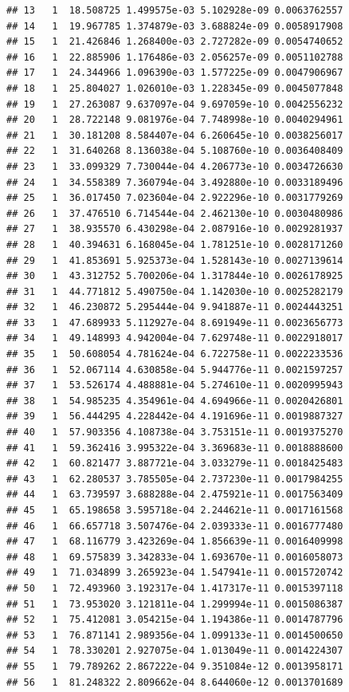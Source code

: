 \documentclass[article]{jss}\usepackage[]{graphicx}\usepackage[]{xcolor}
\makeatletter
\newenvironment{kframe}{%
 \def\at@end@of@kframe{}%
 \ifinner\ifhmode%
  \def\at@end@of@kframe{\end{minipage}}%
  \begin{minipage}{\columnwidth}%
 \fi\fi%
 \def\FrameCommand##1{\hskip\@totalleftmargin \hskip-\fboxsep
 \colorbox{shadecolor}{##1}\hskip-\fboxsep
     \hskip-\linewidth \hskip-\@totalleftmargin \hskip\columnwidth}%
 \MakeFramed {\advance\hsize-\width
   \@totalleftmargin\z@ \linewidth\hsize
   \@setminipage}}%
 {\par\unskip\endMakeFramed%
 \at@end@of@kframe}
\newenvironment{knitrout}{}{} %
\makeatother
\begin{document}
\begin{knitrout}
\begin{kframe}
\begin{verbatim}
## 13   1  18.508725 1.499575e-03 5.102928e-09 0.0063762557
## 14   1  19.967785 1.374879e-03 3.688824e-09 0.0058917908
## 15   1  21.426846 1.268400e-03 2.727282e-09 0.0054740652
## 16   1  22.885906 1.176486e-03 2.056257e-09 0.0051102788
## 17   1  24.344966 1.096390e-03 1.577225e-09 0.0047906967
## 18   1  25.804027 1.026010e-03 1.228345e-09 0.0045077848
## 19   1  27.263087 9.637097e-04 9.697059e-10 0.0042556232
## 20   1  28.722148 9.081976e-04 7.748998e-10 0.0040294961
## 21   1  30.181208 8.584407e-04 6.260645e-10 0.0038256017
## 22   1  31.640268 8.136038e-04 5.108760e-10 0.0036408409
## 23   1  33.099329 7.730044e-04 4.206773e-10 0.0034726630
## 24   1  34.558389 7.360794e-04 3.492880e-10 0.0033189496
## 25   1  36.017450 7.023604e-04 2.922296e-10 0.0031779269
## 26   1  37.476510 6.714544e-04 2.462130e-10 0.0030480986
## 27   1  38.935570 6.430298e-04 2.087916e-10 0.0029281937
## 28   1  40.394631 6.168045e-04 1.781251e-10 0.0028171260
## 29   1  41.853691 5.925373e-04 1.528143e-10 0.0027139614
## 30   1  43.312752 5.700206e-04 1.317844e-10 0.0026178925
## 31   1  44.771812 5.490750e-04 1.142030e-10 0.0025282179
## 32   1  46.230872 5.295444e-04 9.941887e-11 0.0024443251
## 33   1  47.689933 5.112927e-04 8.691949e-11 0.0023656773
## 34   1  49.148993 4.942004e-04 7.629748e-11 0.0022918017
## 35   1  50.608054 4.781624e-04 6.722758e-11 0.0022233536
## 36   1  52.067114 4.630858e-04 5.944776e-11 0.0021597257
## 37   1  53.526174 4.488881e-04 5.274610e-11 0.0020995943
## 38   1  54.985235 4.354961e-04 4.694966e-11 0.0020426801
## 39   1  56.444295 4.228442e-04 4.191696e-11 0.0019887327
## 40   1  57.903356 4.108738e-04 3.753151e-11 0.0019375270
## 41   1  59.362416 3.995322e-04 3.369683e-11 0.0018888600
## 42   1  60.821477 3.887721e-04 3.033279e-11 0.0018425483
## 43   1  62.280537 3.785505e-04 2.737230e-11 0.0017984255
## 44   1  63.739597 3.688288e-04 2.475921e-11 0.0017563409
## 45   1  65.198658 3.595718e-04 2.244621e-11 0.0017161568
## 46   1  66.657718 3.507476e-04 2.039333e-11 0.0016777480
## 47   1  68.116779 3.423269e-04 1.856639e-11 0.0016409998
## 48   1  69.575839 3.342833e-04 1.693670e-11 0.0016058073
## 49   1  71.034899 3.265923e-04 1.547941e-11 0.0015720742
## 50   1  72.493960 3.192317e-04 1.417317e-11 0.0015397118
## 51   1  73.953020 3.121811e-04 1.299994e-11 0.0015086387
## 52   1  75.412081 3.054215e-04 1.194386e-11 0.0014787796
## 53   1  76.871141 2.989356e-04 1.099133e-11 0.0014500650
## 54   1  78.330201 2.927075e-04 1.013049e-11 0.0014224307
## 55   1  79.789262 2.867222e-04 9.351084e-12 0.0013958171
## 56   1  81.248322 2.809662e-04 8.644060e-12 0.0013701689

\end{verbatim}
\end{kframe}
\end{knitrout}
\end{document}
